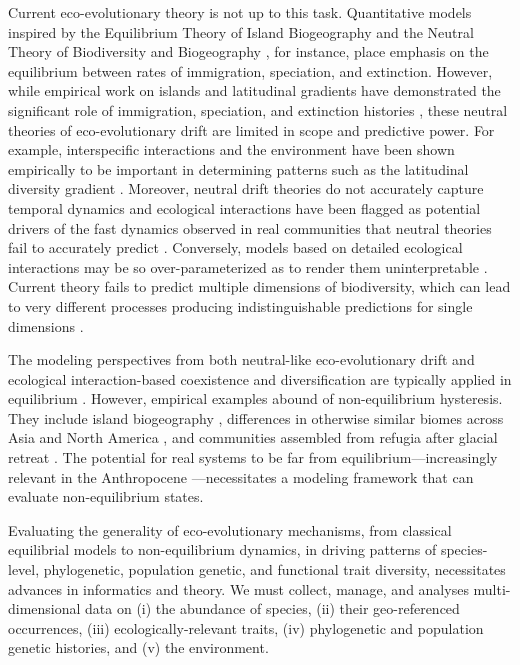 \documentclass[11pt]{article}
\begin{document}
Current eco-evolutionary theory is not up to this task. Quantitative
models inspired by the Equilibrium Theory of Island Biogeography
\cite{MacArthur1967-ux} and the Neutral Theory of Biodiversity and
Biogeography \cite{Hubbell2001-dx}, for instance, place emphasis on
the equilibrium between rates of immigration, speciation, and
extinction. However, while empirical work on islands and latitudinal
gradients have demonstrated the significant role of immigration,
speciation, and extinction histories \cite{Gillespie2004-zv,
  Owens2017-ja}, these neutral theories of eco-evolutionary drift are
limited in scope and predictive power. For example,
interspecific interactions and the environment have been shown
empirically to be important in determining patterns such as the
latitudinal diversity gradient \cite{Janzen1967-fk, Mittelbach2007-ui,
  Pianka1966-ky}. Moreover, neutral drift theories do not accurately
capture temporal dynamics \cite{Ricklefs2006-tn, Chisholm2014-mu} and
ecological interactions have been flagged as potential drivers of the
fast dynamics observed in real communities that neutral theories fail
to accurately predict \cite{Rosindell2015-gp,
  Ricklefs2006-tn}. Conversely, models based on detailed ecological
interactions may be so over-parameterized as to render them
uninterpretable \cite{Rosindell2012-pm}. Current theory fails to
predict multiple dimensions of biodiversity, which can lead to very
different processes producing indistinguishable predictions for single
dimensions \cite{Chisholm2010-yg, McGill2003-sf, McGill2007-zd,
  Leibold2017-jv}.

The modeling perspectives from both neutral-like eco-evolutionary drift and
ecological interaction-based coexistence and diversification are
typically applied in equilibrium \cite{Rominger_undated-cw,
  Etienne2007-we, Chesson2000-uc, Hubbell2001-dx}.  However, empirical
examples abound of non-equilibrium hysteresis. They include island
biogeography \cite{Ricklefs2001-af}, differences in otherwise similar
biomes across Asia and North America
\cite{Qian2005-co,Yu2017-cc}, and communities assembled from refugia
after glacial retreat \cite{Carnaval2008-og, Carnaval2009-vd,
  Burbrink2016-nu}. The potential for real systems to be far from
equilibrium---increasingly relevant in the Anthropocene
\cite{Barnosky2012-qz}---necessitates a modeling framework that can
evaluate non-equilibrium states.

Evaluating the generality of eco-evolutionary mechanisms, from
classical equilibrial models to non-equilibrium dynamics, in driving
patterns of species-level, phylogenetic, population genetic, and
functional trait diversity, necessitates advances in informatics and
theory.  We must collect, manage, and analyses multi-dimensional data
on (i) the abundance of species, (ii) their geo-referenced
occurrences, (iii) ecologically-relevant traits, (iv) phylogenetic and
population genetic histories, and (v) the environment.
\end{document}
